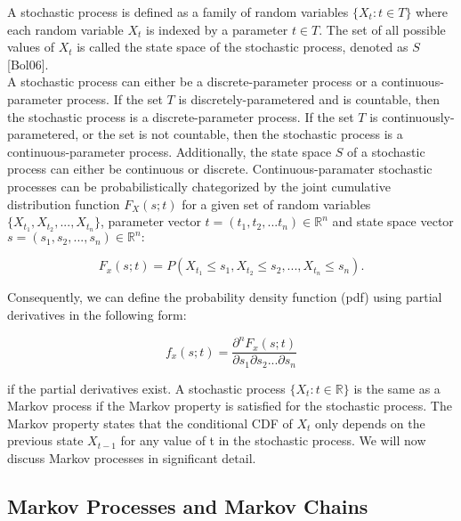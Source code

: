 \documentclass[a4paper,11pt,titlepage]{article}
\begin{document}
A stochastic process is defined as a family of random variables $\{X_t : t \in T\}$ where each random variable $X_t$ is indexed by a parameter $t \in T$. The set of all possible values of $X_t$ is called the state space of the stochastic process, denoted as $S$ [Bol06]. \\

A stochastic process can either be a discrete-parameter process or a continuous-parameter process. If the set $T$ is discretely-parametered and is countable, then the stochastic process is a discrete-parameter process. If the set $T$ is continuously-parametered, or the set is not countable, then the stochastic process is a continuous-parameter process. Additionally, the state space $S$ of a stochastic process can either be continuous or discrete. Continuous-paramater stochastic processes can be probabilistically chategorized by the joint cumulative distribution function $F_X(s;t)$ for a given set of random variables $\{X_{t_1}, X_{t_2}, ..., X_{t_n}\}$, parameter vector $t = (t_1,t_2,...t_n) \in \mathbb{R}^n$ and state space vector $s = (s_1,s_2,...,s_n) \in \mathbb{R}^n:$

\begin{equation}
F_x(s;t) = P(X_{t_1} \leqslant s_1, X_{t_2} \leqslant s_2,...,X_{t_n} \leqslant s_n).    
\end{equation}

Consequently, we can define the probability density function (pdf) using partial derivatives in the following form: 

\begin{equation}
f_x(s;t) = \frac{\partial ^ n F_x(s;t)}{\partial s_1 \partial s_2 ... \partial s_n}
\end{equation}

if the partial derivatives exist. A stochastic process $\{X_t : t \in \mathbb{R}\}$ is the same as a Markov process if the Markov property is satisfied for the stochastic process. The Markov property states that the conditional CDF of $X_t$ only depends on the previous state $X_{t-1}$ for any value of t in the stochastic process. We will now discuss Markov processes in significant detail. 

\subsection{Markov Processes and Markov Chains}
\end{document}
